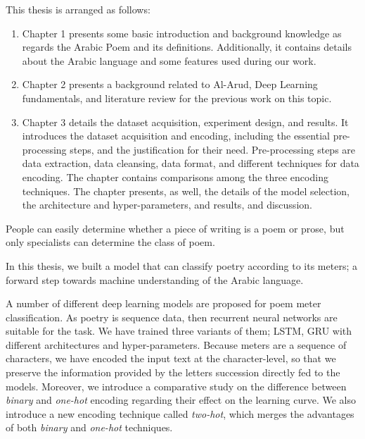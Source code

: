 \begin{spacing}{1}\end{spacing}
This thesis is arranged as follows:
\begin{enumerate}
  \item Chapter 1 presents some basic introduction and background knowledge as regards the Arabic Poem and its definitions. Additionally, it contains details about the Arabic language and some features used during our work.
  \item Chapter 2 presents a background related to Al-Arud, Deep Learning fundamentals, and
  literature review for the previous work on this topic.
  \item Chapter 3 details the dataset acquisition, experiment design, and results. It introduces the
  dataset acquisition and encoding, including the essential pre-processing steps, and the
  justification for their need. Pre-processing steps are data extraction, data cleansing, data
  format, and different techniques for data encoding. The chapter contains comparisons among the
  three encoding techniques. The chapter presents, as well, the details of the model selection, the
  architecture and hyper-parameters, and results, and discussion.
\end{enumerate}


\begin{spacing}{1}\end{spacing}

People can easily determine whether a piece of writing is a poem or prose, but only specialists can determine the class of poem.

In this thesis, we built a model that can classify poetry according to its meters; a forward step towards machine understanding of the Arabic language.

A number of different deep learning models are proposed for poem meter classification. As poetry is sequence data, then recurrent neural networks are suitable for the task. We have trained three variants of them; LSTM, GRU with different architectures and hyper-parameters. Because meters are a sequence of characters, we have encoded the input text at the character-level, so that we preserve the information provided by the letters succession directly fed to the models. Moreover, we introduce a comparative study on the difference between \textit{binary} and \textit{one-hot} encoding regarding their effect on the learning curve. We also introduce a new encoding technique called \textit{two-hot}, which merges the advantages of both \textit{binary} and \textit{one-hot} techniques.


